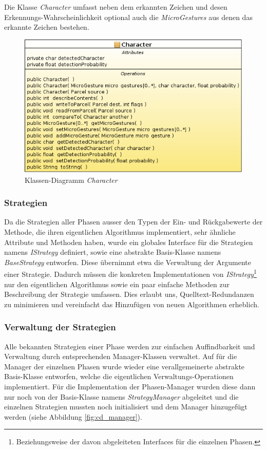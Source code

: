Die Klasse \emph{Character} umfasst neben dem erkannten Zeichen und desen Erkennungs-Wahrscheinlichkeit optional auch die \emph{MicroGestures} aus denen das erkannte Zeichen bestehen.

\begin{figure}[h!]
   \centering
   \includegraphics[width=\textwidth]{img/uml_cd_char} 
   \caption{Klassen-Diagramm \emph{Character}}
   \label{fig:cd_character}
\end{figure}

\subsubsection{Strategien}

Da die Strategien aller Phasen ausser den Typen der Ein- und Rückgabewerte der Methode, die ihren eigentlichen Algorithmus implementiert, sehr ähnliche Attribute und Methoden haben, wurde ein globales Interface für die Strategien namens \emph{IStrategy} definiert, sowie eine abstrakte Basis-Klasse namens \emph{BaseStrategy} entworfen. Diese übernimmt etwa die Verwaltung der Argumente einer Strategie. Dadurch müssen die konkreten Implementationen von \emph{IStrategy}\footnote{Beziehungsweise der davon abgeleiteten Interfaces für die einzelnen Phasen.} nur den eigentlichen Algorithmus sowie ein paar einfache Methoden zur Beschreibung der Strategie umfassen. Dies erlaubt uns, Quelltext-Redundanzen zu minimieren und vereinfacht das Hinzufügen von neuen Algorithmen erheblich.

\subsubsection{Verwaltung der Strategien}

Alle bekannten Strategien einer Phase werden zur einfachen Auffindbarkeit und Verwaltung durch entsprechenden Manager-Klassen verwaltet. Auf für die Manager der einzelnen Phasen wurde wieder eine verallgemeinerte abstrakte Basis-Klasse entworfen, welche die eigentlichen Verwaltungs-Operationen implementiert. Für die Implementation der Phasen-Manager wurden diese dann nur noch von der Basis-Klasse namens \emph{StrategyManager} abgeleitet und die einzelnen Strategien mussten noch initialisiert und dem Manager hinzugefügt werden (siehe Abbildung \ref{fig:cd_manager}).

